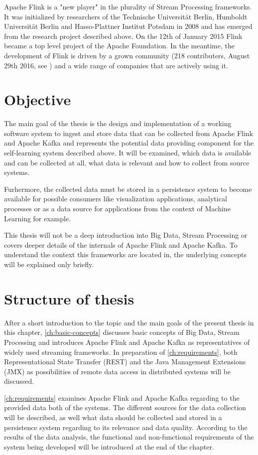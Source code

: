 Apache Flink is a "new player" in the plurality of Stream Processing frameworks. It
was initialized by researchers of the Technische Universität Berlin, Humboldt Universität
Berlin and Hasso-Plattner Institut Potsdam in 2008 and has emerged from the research
project described above.  On the 12th of January 2015 Flink became a top level project
of the Apache Foundation. In the meantime, the development of Flink is driven by a
grown community (218 contributers, August 29th 2016, see \cite{FlinkG16}) and a wide range of
companies that are actively using it.

\section{Objective}
The main goal of the thesis is the design and implementation of a working software system
to ingest and store data that can be collected from Apache Flink and Apache Kafka and
represents the potential data providing component for the self-learning system described
above. It will be examined, which data is available and can be collected at all, what data
is relevant and how to collect from source systems.

Furhermore, the collected data must be stored in a persistence system to become available
for possible consumers like visualization applications, analytical processes or as a data
source for applications from the context of Machine Learning for example.

This thesis will not be a deep introduction into Big Data, Stream Processing or covers deeper
details of the internals of Apache Flink and Apache Kafka. To understand the context this
frameworks are located in, the underlying concepts will be explained only briefly.

\section{Structure of thesis}
After a short introduction to the topic and the main goals of the present thesis in this
chapter, \autoref{ch:basic-concepts} discusses basic concepts of Big Data, Stream Processing and introduces
Apache Flink and Apache Kafka as representatives of widely used streaming frameworks. In preparation of \autoref{ch:requirements},
both Representational State Transfer (REST) and the Java Management Extensions (JMX) as possibilities of remote data access in
distributed systems will be discussed.

\autoref{ch:requirements} examines Apache Flink and Apache Kafka regarding to the provided data
both of the systems. The different sources for the data collection will be described, as
well what data should be collected and stored in a persistence system regarding to its
relevance and data quality. According to the results of the data analysis, the functional
and non-functional requirements of the system being developed will be introduced at the
end of the chapter.

